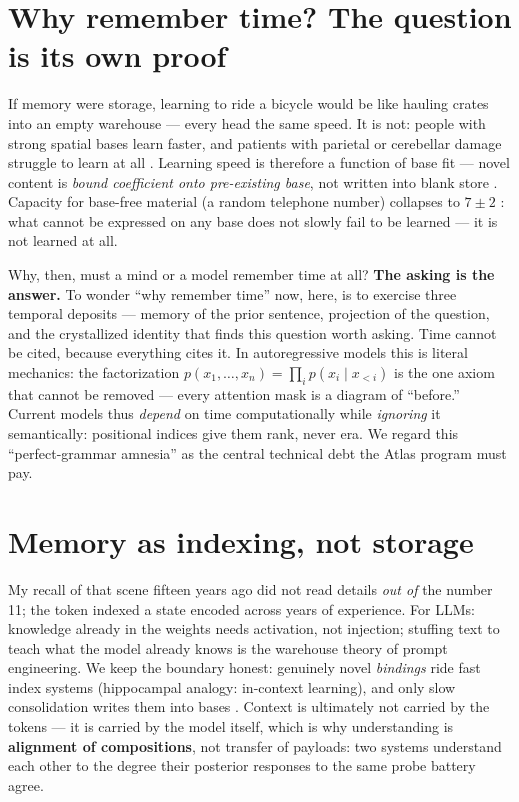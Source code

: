 \documentclass[12pt, a4paper]{article}
\begin{document}
\section{Why remember time? The question is its own proof}
If memory were storage, learning to ride a bicycle would be like hauling crates into an empty warehouse --- every head the same speed. It is not: people with strong spatial bases learn faster, and patients with parietal or cerebellar damage struggle to learn at all \cite{schmidt1975}. Learning speed is therefore a function of base fit --- novel content is \emph{bound coefficient onto pre-existing base}, not written into blank store \cite{bransford1972,rosch1975,chase1973,cls1995}. Capacity for base-free material (a random telephone number) collapses to $7\pm2$ \cite{miller1956}: what cannot be expressed on any base does not slowly fail to be learned --- it is not learned at all.

Why, then, must a mind or a model remember time at all? \textbf{The asking is the answer.} To wonder ``why remember time'' now, here, is to exercise three temporal deposits --- memory of the prior sentence, projection of the question, and the crystallized identity that finds this question worth asking. Time cannot be cited, because everything cites it. In autoregressive models this is literal mechanics: the factorization $p(x_1,\dots,x_n)=\prod_i p(x_i\mid x_{<i})$ is the one axiom that cannot be removed --- every attention mask is a diagram of ``before.'' Current models thus \emph{depend} on time computationally while \emph{ignoring} it semantically: positional indices give them rank, never era. We regard this ``perfect-grammar amnesia'' as the central technical debt the Atlas program must pay.

\section{Memory as indexing, not storage}
My recall of that scene fifteen years ago did not read details \emph{out of} the number 11; the token indexed a state encoded across years of experience. For LLMs: knowledge already in the weights needs activation, not injection; stuffing text to teach what the model already knows is the warehouse theory of prompt engineering. We keep the boundary honest: genuinely novel \emph{bindings} ride fast index systems (hippocampal analogy: in-context learning), and only slow consolidation writes them into bases \cite{cls1995,vonoswald2023}. Context is ultimately not carried by the tokens --- it is carried by the model itself, which is why understanding is \textbf{alignment of compositions}, not transfer of payloads: two systems understand each other to the degree their posterior responses to the same probe battery agree.
\end{document}
